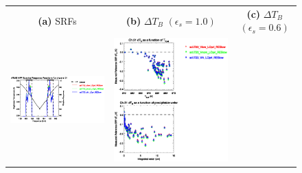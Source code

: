 \begin{figure}[H]
  \centering
  \begin{tabular}{c c c}
    \textsf{\textbf{(a)} SRFs} &
    \textsf{\textbf{(b)} $\Delta T_B$ $(\epsilon_s = 1.0)$} &
    \textsf{\textbf{(c)} $\Delta T_B$ $(\epsilon_s = 0.6)$} \\
    \includegraphics[bb=80 400 280 558,clip,scale=0.85]{graphics/srf/Vset/atms_npp.ch21.osrf.eps} &
    \includegraphics[bb=85 400 260 558,clip,scale=0.85]{graphics/dtb/Vset/e1.0_r0.0/atms_npp.ch21.dTb.eps} & 

\end{tabular}
\end{figure}
